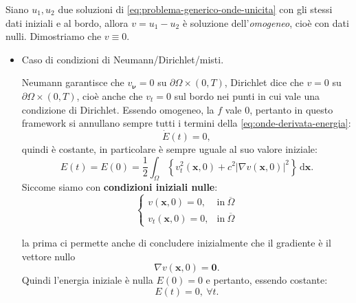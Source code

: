 \documentclass[10pt,a4paper,twoside,openright]{book}
\newcommand{\x}{\mathbf{x}}
\newcommand{\zer}{\mathbf{0}}
\newcommand{\de}{\,\mathrm d}
\newcommand{\dxx}{\de \x}
\begin{document}
\begin{dimostrazione}
	Siano $u_{1} ,u_{2}$ due soluzioni di \eqref{eq:problema-generico-onde-unicita} con gli stessi dati iniziali e al bordo, allora $v=u_{1} -u_{2}$ è soluzione dell'\textit{omogeneo}, cioè con dati nulli. Dimostriamo che $v\equiv 0$.
	\begin{itemize}
		\item Caso di condizioni di Neumann/Dirichlet/misti.
		      
		      Neumann garantisce che $v_{\bm{\nu }} =0$ su $\partial \Omega \times (0,T)$, Dirichlet dice che $v=0$ su $\partial \Omega \times (0,T)$, cioè anche che $v_{t} =0$ sul bordo nei punti in cui vale una condizione di Dirichlet. Essendo omogeneo, la $f$ vale $0$, pertanto in questo framework si annullano sempre tutti i termini della \eqref{eq:onde-derivata-energia}:
		      \begin{equation*}
		      	\dot{E}(t) =0,
		      \end{equation*}quindi è costante, in particolare è sempre uguale al suo valore iniziale:
		      \begin{equation*}
		      	E(t) =E(0) =\frac{1}{2}\int _{\Omega }\left\{v_{t}^{2}(\x ,0) +c^{2}| \nabla v(\x ,0)| ^{2}\right\} \dxx .
		      \end{equation*}Siccome siamo con \textbf{condizioni iniziali nulle}:
		      \begin{equation*}
		      	\begin{cases}
		      		v(\x ,0) =0,     & \text{in} \ \overline{\Omega } \\
		      		v_{t}(\x ,0) =0, & \text{in} \ \overline{\Omega } 
		      	\end{cases}
		      \end{equation*}
		      
		      la prima ci permette anche di concludere inizialmente che il gradiente è il vettore nullo
		      \begin{equation*}
		      \nabla v(\x ,0) =\zer .
		\end{equation*}Quindi l'energia iniziale è nulla $E(0) =0$ e pertanto, essendo costante:
		\begin{equation*}
			E(t) =0,\ \forall t.
		\end{equation*}
		

\end{itemize}
\end{dimostrazione}
\end{document}
